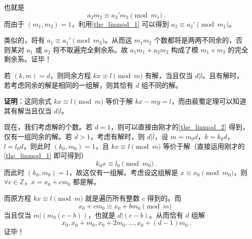 也就是
\begin{equation}
a_2 m_2 \equiv a_2' m_2 \pmod{m_1} ~.
\end{equation}
而由于 $(m_1, m_2) = 1$，利用\autoref{the_linmod_1} 可以得到 $a_2 \equiv a_2' \pmod{m_1}$。

类似的，将有 $a_1 \equiv a_1' \pmod{m_2}$。从而这 $m_1m_2$ 个数都将是两两不同余的，否则某对 $a_1$ 或 $a_2$ 将不取遍完全剩余系。故 $a_1m_1+a_2m_2$ 构成了模 $m_1\times m_2$ 的完全剩余系。证毕！


\begin{theorem}{}
若 $(k, m) = d$，则同余方程 $kx \equiv l \pmod m$ 有解，当且仅当 $d | l$。且有解时，若考虑同余的解是相同的一组解，则其恰有 $d$ 组不同的解。
\end{theorem}
\textbf{证明}：这同余式 $kx \equiv l \pmod m$ 等价于解 $kx - my = l$，而由裴蜀定理可以知道其有解当且仅当 $d | l$。

现在，我们考虑解的个数。若 $d=1$，则可以直接由刚才的\autoref{the_linmod_2} 得到，仅有一组同余的解。若 $d > 1$，考虑有解时，则 $d|l$，设 $m = m_0 d$，$k = k_0 d$，$l = l_0 d$，则此时 $(k_0, m_0) = 1$，且 $kx \equiv l \pmod m$ 等价于解（直接运用刚才的\autoref{the_linmod_1} 即可得到）
\begin{equation}
k_0 x \equiv l_0 \pmod {m_0} ~.
\end{equation}
而此时 $(k_0, m_0) = 1$，故这仅有一组解。考虑设这组解是 $x \equiv x_0 \pmod {m_0}$，则 $\forall c \in \mathbb Z$，$x = x_0 + c m_0$ 都是解。

而原方程 $kx \equiv l \pmod m$ 就是遍历所有整数 $c$ 得到的。而
\begin{equation}
x_0 + c m_0 \equiv x_0 + b m_0 \pmod m ~~
\end{equation}
当且仅当 $m | (m_0 (c - b))$，也就是 $d | (c - b)$。从而恰有 $d$ 组解
\begin{equation}
x_0, x_0 + m_0, x_0 + 2 m_0, \dots, x_0 + (d-1) m_0 ~.
\end{equation}
证毕！